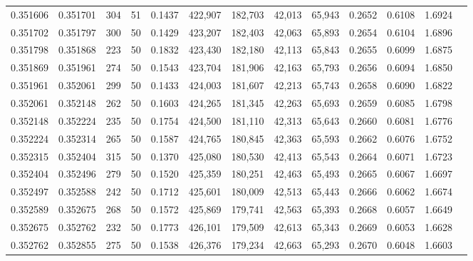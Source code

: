 \begin{tabular}{rrrrrrrrrrrrr}
0.351606 & 0.351701 &   304 &  51 &                                     0.1437 & 422,907 & 182,703 &  42,013 &  65,943 & 0.2652 & 0.6108 & 1.6924 \\
0.351702 & 0.351797 &   300 &  50 &                                     0.1429 & 423,207 & 182,403 &  42,063 &  65,893 & 0.2654 & 0.6104 & 1.6896 \\
0.351798 & 0.351868 &   223 &  50 &                                     0.1832 & 423,430 & 182,180 &  42,113 &  65,843 & 0.2655 & 0.6099 & 1.6875 \\
0.351869 & 0.351961 &   274 &  50 &                                     0.1543 & 423,704 & 181,906 &  42,163 &  65,793 & 0.2656 & 0.6094 & 1.6850 \\
0.351961 & 0.352061 &   299 &  50 &                                     0.1433 & 424,003 & 181,607 &  42,213 &  65,743 & 0.2658 & 0.6090 & 1.6822 \\
0.352061 & 0.352148 &   262 &  50 &                                     0.1603 & 424,265 & 181,345 &  42,263 &  65,693 & 0.2659 & 0.6085 & 1.6798 \\
0.352148 & 0.352224 &   235 &  50 &                                     0.1754 & 424,500 & 181,110 &  42,313 &  65,643 & 0.2660 & 0.6081 & 1.6776 \\
0.352224 & 0.352314 &   265 &  50 &                                     0.1587 & 424,765 & 180,845 &  42,363 &  65,593 & 0.2662 & 0.6076 & 1.6752 \\
0.352315 & 0.352404 &   315 &  50 &                                     0.1370 & 425,080 & 180,530 &  42,413 &  65,543 & 0.2664 & 0.6071 & 1.6723 \\
0.352404 & 0.352496 &   279 &  50 &                                     0.1520 & 425,359 & 180,251 &  42,463 &  65,493 & 0.2665 & 0.6067 & 1.6697 \\
0.352497 & 0.352588 &   242 &  50 &                                     0.1712 & 425,601 & 180,009 &  42,513 &  65,443 & 0.2666 & 0.6062 & 1.6674 \\
0.352589 & 0.352675 &   268 &  50 &                                     0.1572 & 425,869 & 179,741 &  42,563 &  65,393 & 0.2668 & 0.6057 & 1.6649 \\
0.352675 & 0.352762 &   232 &  50 &                                     0.1773 & 426,101 & 179,509 &  42,613 &  65,343 & 0.2669 & 0.6053 & 1.6628 \\
0.352762 & 0.352855 &   275 &  50 &                                     0.1538 & 426,376 & 179,234 &  42,663 &  65,293 & 0.2670 & 0.6048 & 1.6603 \\

\end{tabular}
